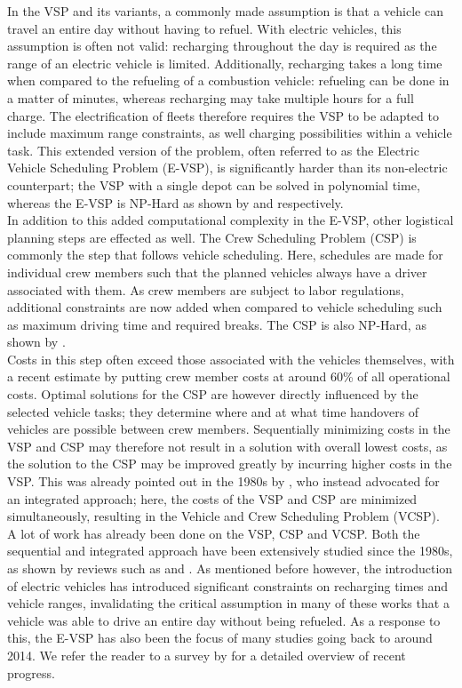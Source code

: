 \documentclass[]{article}
\begin{document}
In the VSP and its variants, a commonly made assumption is that a vehicle can travel an entire day without having to refuel. With electric vehicles, this assumption is often not valid: recharging throughout the day is required as the range of an electric vehicle is limited. Additionally, recharging takes a long time when compared to the refueling of a combustion vehicle: refueling can be done in a matter of minutes, whereas recharging may take multiple hours for a full charge. The electrification of fleets therefore requires the VSP to be adapted to include maximum range constraints, as well charging possibilities within a vehicle task. This extended version of the problem, often referred to as the Electric Vehicle Scheduling Problem (E-VSP), is significantly harder than its non-electric counterpart; the VSP with a single depot can be solved in polynomial time, whereas the E-VSP is NP-Hard as shown by \citet{Bunte2009} and \citet{Sassi2014} respectively. \\
In addition to this added computational complexity in the E-VSP, other logistical planning steps are effected as well. The Crew Scheduling Problem (CSP) is commonly the step that follows vehicle scheduling. Here, schedules are made for individual crew members such that the planned vehicles always have a driver associated with them. As crew members are subject to labor regulations, additional constraints are now added when compared to vehicle scheduling such as maximum driving time and required breaks. The CSP is also NP-Hard, as shown by \citet{Fischetti1989}.\\
Costs in this step often exceed those associated with the vehicles themselves, with a recent estimate by \citet{Perumal2019Crew} putting crew member costs at around 60\% of all operational costs. Optimal solutions for the CSP are however directly influenced by the selected vehicle tasks; they determine where and at what time handovers of vehicles are possible between crew members. Sequentially minimizing costs in the VSP and CSP may therefore not result in a solution with overall lowest costs, as the solution to the CSP may be improved greatly by incurring higher costs in the VSP. This was already pointed out in the 1980s by \citet{Bodin1983}, who instead advocated for an integrated approach; here, the costs of the VSP and CSP are minimized simultaneously, resulting in the Vehicle and Crew Scheduling Problem (VCSP). \\
A lot of work has already been done on the VSP, CSP and VCSP. Both the sequential and integrated approach have been extensively studied since the 1980s, as shown by reviews such as \citet{Ibarra-Rojas2015} and \citet{Ge2024}. As mentioned before however, the introduction of electric vehicles has introduced significant constraints on recharging times and vehicle ranges, invalidating the critical assumption in many of these works that a vehicle was able to drive an entire day without being refueled. As a response to this, the E-VSP has also been the focus of many studies going back to around 2014. We refer the reader to a survey by \citet{Perumal2022LitRev} for a detailed overview of recent progress. \\
\end{document}

